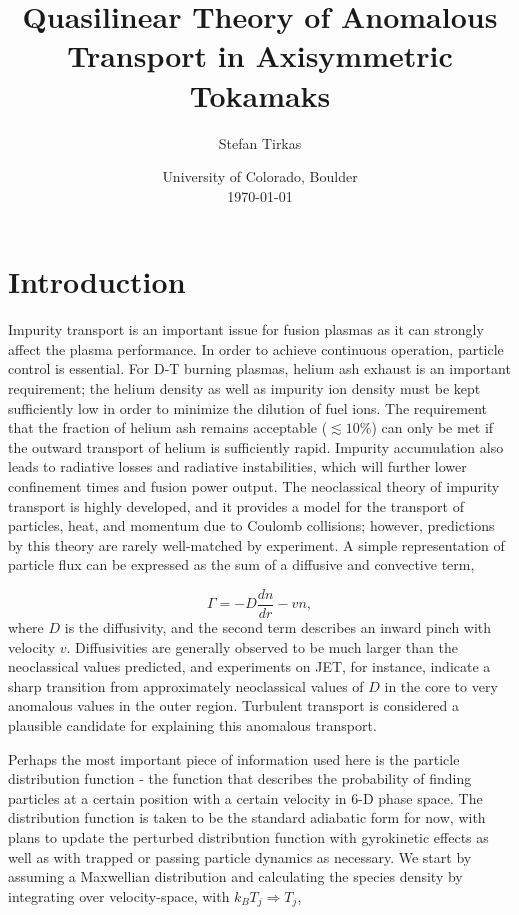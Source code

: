 \documentclass[12pt]{article}
\numberwithin{equation}{section}
\begin{document}
\title{Quasilinear Theory of Anomalous Transport in Axisymmetric Tokamaks}
\author{Stefan Tirkas}


\date{University of Colorado, Boulder\\[2ex]%
      \today}

\maketitle


\section{Introduction}
   \quad Impurity transport is an important issue for fusion plasmas as it can strongly affect the plasma performance.
In order to achieve continuous operation, particle control is essential\cite{ITER}. For D-T burning plasmas, helium ash exhaust is
an important requirement; the helium density as well as impurity ion density must be kept sufficiently low in order to
minimize the dilution of fuel ions. The requirement that the fraction of helium ash remains acceptable ($\lesssim 10\%$) can
only be met if the outward transport of helium is sufficiently rapid\cite{WessonA}. Impurity accumulation also leads to radiative
losses and radiative instabilities, which will further lower confinement times and fusion power output. The neoclassical theory of
impurity transport is highly developed, and it provides a model for the transport of particles, heat, and momentum due to Coulomb
collisions; however, predictions by this theory are rarely well-matched by experiment. A simple representation of particle flux can
be expressed as the sum of a diffusive and convective term,

   \begin{equation}
      \Gamma = -D\frac{dn}{dr} - vn,
   \end{equation}
where $D$ is the diffusivity, and the second term describes an inward pinch with velocity $v$. Diffusivities are generally observed
to be much larger than the neoclassical values predicted, and experiments on JET, for instance, indicate a sharp transition from
approximately neoclassical values of $D$ in the core to very anomalous values in the outer region\cite{WessonB}. Turbulent transport
is considered a plausible candidate for explaining this anomalous transport.

   \quad Perhaps the most important piece of information used here is the particle distribution function - the function that describes the
probability of finding particles at a certain position with a certain velocity in 6-D phase space. The distribution function is taken to be
the standard adiabatic form for now, with plans to update the perturbed distribution function with gyrokinetic effects as well as with trapped
or passing particle dynamics as necessary. We start by assuming a Maxwellian distribution and calculating the species density by integrating over
velocity-space, with $k_B T_j \Rightarrow T_j$,
   
\end{document}
